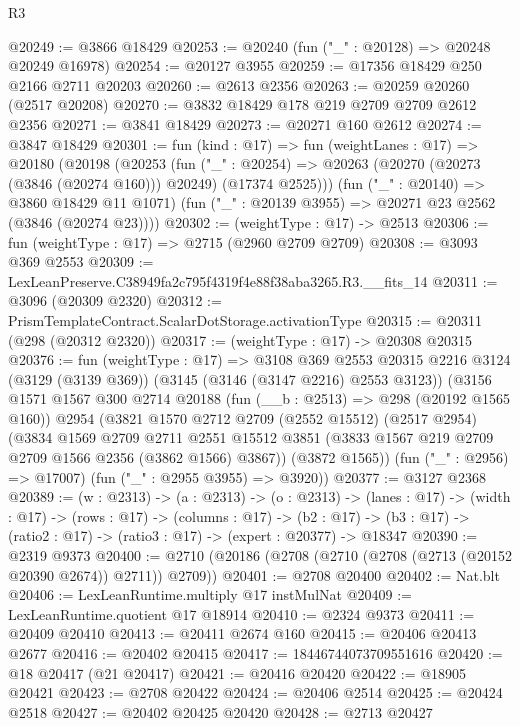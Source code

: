 \begin{lexlean}{R3}
\begin{coremodule}
@20249 := @3866 @18429
@20253 := @20240 (fun ("_" : @20128) => @20248 @20249 @16978)
@20254 := @20127 @3955
@20259 := @17356 @18429 @250 @2166 @2711 @20203
@20260 := @2613 @2356
@20263 := @20259 @20260 (@2517 @20208)
@20270 := @3832 @18429 @178 @219 @2709 @2709 @2612 @2356
@20271 := @3841 @18429
@20273 := @20271 @160 @2612
@20274 := @3847 @18429
@20301 := fun (kind : @17) =>
  fun (weightLanes : @17) =>
  @20180
    (@20198
      (@20253
        (fun ("_" : @20254) =>
        @20263 (@20270 (@20273 (@3846 (@20274 @160))) @20249) (@17374 @2525)))
      (fun ("_" : @20140) => @3860 @18429 @11 @1071)
      (fun ("_" : @20139 @3955) => @20271 @23 @2562 (@3846 (@20274 @23))))
@20302 := (weightType : @17) -> @2513
@20306 := fun (weightType : @17) => @2715 (@2960 @2709 @2709)
@20308 := @3093 @369 @2553
@20309 := LexLeanPreserve.C38949fa2c795f4319f4e88f38aba3265.R3.__fits_14
@20311 := @3096 (@20309 @2320)
@20312 := PrismTemplateContract.ScalarDotStorage.activationType
@20315 := @20311 (@298 (@20312 @2320))
@20317 := (weightType : @17) -> @20308 @20315
@20376 := fun (weightType : @17) =>
  @3108
    @369
    @2553
    @20315
    @2216
    @3124
    (@3129 (@3139 @369))
    (@3145 (@3146 (@3147 @2216) @2553 @3123))
    (@3156
      @1571
      @1567
      @300
      @2714
      @20188
      (fun (__b : @2513) => @298 (@20192 @1565 @160))
      @2954
      (@3821
        @1570
        @2712
        @2709
        (@2552 @15512)
        (@2517 @2954)
        (@3834
          @1569
          @2709
          @2711
          @2551
          @15512
          @3851
          (@3833 @1567 @219 @2709 @2709 @1566 @2356 (@3862 @1566) @3867))
        (@3872 @1565))
      (fun ("_" : @2956) => @17007)
      (fun ("_" : @2955 @3955) => @3920))
@20377 := @3127 @2368
@20389 := (w : @2313) ->
  (a : @2313) ->
  (o : @2313) ->
  (lanes : @17) ->
  (width : @17) ->
  (rows : @17) ->
  (columns : @17) ->
  (b2 : @17) -> (b3 : @17) -> (ratio2 : @17) -> (ratio3 : @17) -> (expert : @20377) -> @18347
@20390 := @2319 @9373
@20400 := @2710 (@20186 (@2708 (@2710 (@2708 (@2713 (@20152 @20390 @2674)) @2711)) @2709))
@20401 := @2708 @20400
@20402 := Nat.blt
@20406 := LexLeanRuntime.multiply @17 instMulNat
@20409 := LexLeanRuntime.quotient @17 @18914
@20410 := @2324 @9373
@20411 := @20409 @20410
@20413 := @20411 @2674 @160
@20415 := @20406 @20413 @2677
@20416 := @20402 @20415
@20417 := 18446744073709551616
@20420 := @18 @20417 (@21 @20417)
@20421 := @20416 @20420
@20422 := @18905 @20421
@20423 := @2708 @20422
@20424 := @20406 @2514
@20425 := @20424 @2518
@20427 := @20402 @20425 @20420
@20428 := @2713 @20427

\end{coremodule}
\end{lexlean}
